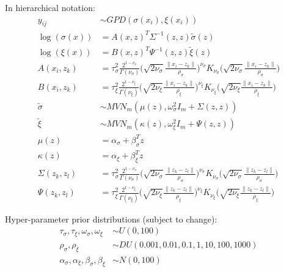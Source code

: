 \documentclass{article}
\begin{document}
In hierarchical notation:
\begin{align*}
y_{ij} &\sim GPD(\sigma(x_i), \xi(x_i)) \\
\log (\sigma (x)) &= A(x, z)^T \Sigma^{-1}(z,z) \tilde{\sigma}(z) \\
\log (\xi (x)) &= B(x, z)^T \Psi^{-1}(z,z) \tilde{\xi}(z) \\
A(x_i, z_k) &= \tau_\sigma^2 \frac{2^{1-\nu_\sigma}}{\Gamma(\nu_\sigma)}\Bigg(\sqrt{2\nu_\sigma}\frac{\|x_i - z_k\|}{\rho_\sigma}\Bigg)^{\nu_\sigma} K_{\nu_\sigma}\Bigg(\sqrt{2\nu_\sigma}\frac{\|x_i - z_k\|}{\rho_\sigma}\Bigg)\\
B(x_i, z_k) &= \tau_\xi^2 \frac{2^{1-\nu_\xi}}{\Gamma(\nu_\xi)}\Bigg(\sqrt{2\nu_\xi}\frac{\|x_i - z_k\|}{\rho_\xi}\Bigg)^{\nu_\xi} K_{\nu_\xi}\Bigg(\sqrt{2\nu_\xi}\frac{\|x_i - z_k\|}{\rho_\xi}\Bigg)\\
\tilde{\sigma} &\sim MVN_m(\mu(z), \omega_\sigma^2 I_m + \Sigma(z, z))\\
\tilde{\xi} &\sim MVN_m(\kappa(z), \omega_\xi^2 I_m + \Psi(z, z))\\
\mu(z) &= \alpha_\sigma + \beta_\sigma ^T z\\
\kappa(z) &= \alpha_\xi + \beta_\xi ^T z\\
\Sigma(z_k, z_l) &= \tau_\sigma^2 \frac{2^{1-\nu_\sigma}}{\Gamma(\nu_\sigma)}\Bigg(\sqrt{2\nu_\sigma}\frac{\|z_k - z_l\|}{\rho_\sigma}\Bigg)^{\nu_\sigma} K_{\nu_\sigma}\Bigg(\sqrt{2\nu_\sigma}\frac{\|z_k - z_l\|}{\rho_\sigma}\Bigg)\\
\Psi(z_k, z_l) &= \tau_\xi^2 \frac{2^{1-\nu_\xi}}{\Gamma(\nu_\xi)}\Bigg(\sqrt{2\nu_\xi}\frac{\|z_k - z_l\|}{\rho_\xi}\Bigg)^{\nu_\xi} K_{\nu_\xi}\Bigg(\sqrt{2\nu_\xi}\frac{\|z_k - z_l\|}{\rho_\xi}\Bigg)
\end{align*}

Hyper-parameter prior distributions (subject to change):
\begin{align*}
\tau_\sigma, \tau_\xi, \omega_\sigma, \omega_\xi &\sim U(0, 100) \\
\rho_\sigma, \rho_\xi &\sim DU(0.001, 0.01, 0.1, 1, 10, 100, 1000)\\
\alpha_\sigma, \alpha_\xi, \beta_\sigma, \beta_\xi &\sim N(0, 100)\\
\end{align*}
\end{document}
